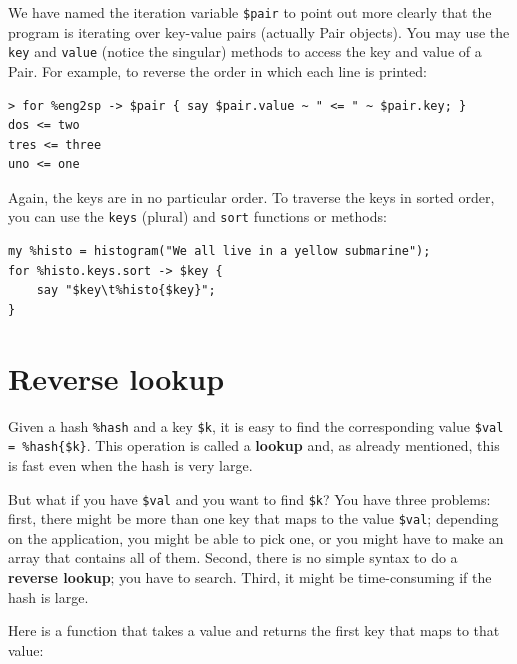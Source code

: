 We have named the iteration variable \verb'$pair' to point 
out more clearly that the program is iterating over key-value 
pairs (actually Pair objects). You may use the {\tt key} and {\tt value} (notice 
the singular) methods to access the key and value of a Pair. 
For example, to reverse the order in which each line is printed:

\begin{verbatim}
> for %eng2sp -> $pair { say $pair.value ~ " <= " ~ $pair.key; }
dos <= two
tres <= three
uno <= one
\end{verbatim}

Again, the keys are in no particular order.  To traverse 
the keys in sorted order, you can use the {\tt keys} 
(plural) and {\tt sort} functions or methods:

\begin{verbatim}
my %histo = histogram("We all live in a yellow submarine");
for %histo.keys.sort -> $key {
    say "$key\t%histo{$key}";
}
\end{verbatim}



\section{Reverse lookup}
\label{raise}

Given a hash \verb'%hash' and a key \verb'$k', it is easy to
find the corresponding value \verb'$val = %hash{$k}'.  
This operation is called a {\bf lookup} and, as already 
mentioned, this is fast even when the hash is very large.

But what if you have \verb'$val' and you want to find 
\verb'$k'? You have three problems: first, there might be 
more than one key that maps to the value \verb'$val'; depending 
on the application, you might be able to pick one, or you 
might have to make an array that contains all of them.  
Second, there is no simple syntax to do a {\bf reverse lookup}; 
you have to search. Third, it might be time-consuming if 
the hash is large.

Here is a function that takes a value and returns the first
key that maps to that value:

